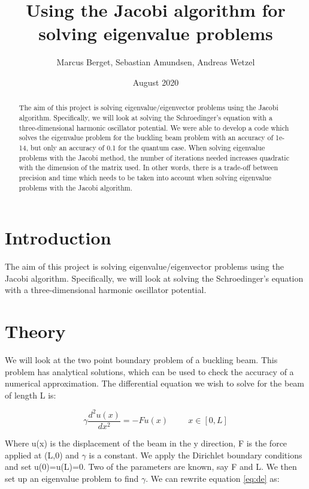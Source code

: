 \documentclass[norsk,a4paper,12pt]{article}
\begin{document}
\title{Using the Jacobi algorithm for solving eigenvalue problems}
\author{Marcus Berget, Sebastian Amundsen, Andreas Wetzel}
\date{August 2020}
\maketitle

\begin{abstract}
The aim of this project is solving eigenvalue/eigenvector problems using the Jacobi algorithm. Specifically, we will look at solving the Schroedinger's equation with a three-dimensional harmonic oscillator potential. We were able to develop a code which solves the eigenvalue problem for the buckling beam problem with an accuracy of 1e-14, but only an accuracy of 0.1 for the quantum case. When solving eigenvalue problems with the Jacobi method, the number of iterations needed increases quadratic with the dimension of the matrix used. In other words, there is a trade-off between precision and time which needs to be taken into account when solving eigenvalue problems with the Jacobi algorithm. 
\end{abstract}

\section{Introduction}

The aim of this project is solving eigenvalue/eigenvector problems using the Jacobi algorithm. Specifically, we will look at solving the Schroedinger's equation with a three-dimensional harmonic oscillator potential. 

\section{Theory}

We will look at the two point boundary problem of a buckling beam. This problem has analytical solutions, which can be used to check the accuracy of a numerical approximation. The differential equation we wish to solve for the beam of length L is:

\begin{equation}
\gamma \frac{d^2 u(x)}{dx^2}=-Fu(x)  \hspace{1cm}  x \in [0,L]
 \label{eq:de}
 \end{equation}

Where u(x) is the displacement of the beam in the y direction, F is the force applied at (L,0) and $\gamma$ is a constant. We apply the Dirichlet boundary conditions and set u(0)=u(L)=0. Two of the parameters are known, say F and L. We then set up an eigenvalue problem to find $\gamma$. We can rewrite equation \ref{eq:de} as:
\end{document}
